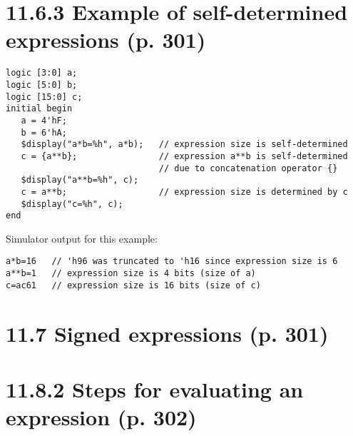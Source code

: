 \documentclass{article}
\begin{document}
{
  \color{red}

  \section*{11.6.3 Example of self-determined expressions (p. 301)}

  \begin{verbatim}
logic [3:0] a;
logic [5:0] b;
logic [15:0] c;
initial begin
   a = 4'hF;
   b = 6'hA;
   $display("a*b=%h", a*b);   // expression size is self-determined
   c = {a**b};                // expression a**b is self-determined
                              // due to concatenation operator {}
   $display("a**b=%h", c);
   c = a**b;                  // expression size is determined by c
   $display("c=%h", c);
end
\end{verbatim}

  Simulator output for this example:
  \begin{verbatim}
a*b=16   // 'h96 was truncated to 'h16 since expression size is 6
a**b=1   // expression size is 4 bits (size of a)
c=ac61   // expression size is 16 bits (size of c)
\end{verbatim}

}

\section*{11.7 Signed expressions (p. 301)}

\textelp{}

\section*{11.8.2 Steps for evaluating an expression (p. 302)}
\end{document}
